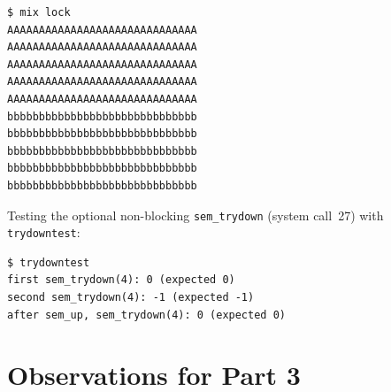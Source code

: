 \documentclass{../latex/utmreport}
\begin{document}
\begin{lstlisting}
$ mix lock
AAAAAAAAAAAAAAAAAAAAAAAAAAAAAA
AAAAAAAAAAAAAAAAAAAAAAAAAAAAAA
AAAAAAAAAAAAAAAAAAAAAAAAAAAAAA
AAAAAAAAAAAAAAAAAAAAAAAAAAAAAA
AAAAAAAAAAAAAAAAAAAAAAAAAAAAAA
bbbbbbbbbbbbbbbbbbbbbbbbbbbbbb
bbbbbbbbbbbbbbbbbbbbbbbbbbbbbb
bbbbbbbbbbbbbbbbbbbbbbbbbbbbbb
bbbbbbbbbbbbbbbbbbbbbbbbbbbbbb
bbbbbbbbbbbbbbbbbbbbbbbbbbbbbb
\end{lstlisting}

Testing the optional non-blocking \texttt{sem\_trydown} (system call~27) with \texttt{trydowntest}:

\begin{lstlisting}
$ trydowntest
first sem_trydown(4): 0 (expected 0)
second sem_trydown(4): -1 (expected -1)
after sem_up, sem_trydown(4): 0 (expected 0)
\end{lstlisting}

\section{Observations for Part 3}
\end{document}

